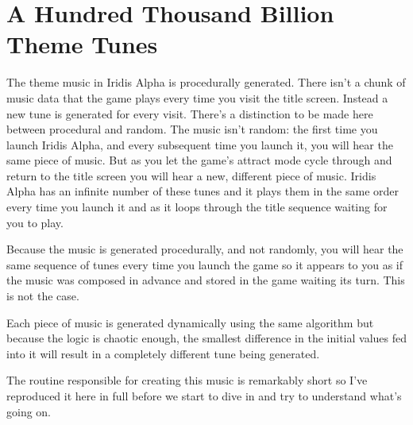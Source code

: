 \chapter{A Hundred Thousand Billion Theme Tunes} 
\label{sec:music}

\lstset{style=6502Style}
The theme music in Iridis Alpha is procedurally generated. There isn't a chunk of music
data that the game plays every time you visit the title screen. Instead a new tune is generated
for every visit. There's a distinction to be made here between procedural and random. The 
music isn't random: the first time you launch Iridis Alpha, and every subsequent time you launch
it, you will hear the same piece of music. But as you let the game's attract mode cycle through and return
to the title screen you will hear a new, different piece of music. Iridis Alpha has an infinite
number of these tunes and it plays them in the same order every time you launch it and as it loops
through the title sequence waiting for you to play.

Because the music is generated procedurally, and not randomly, you will hear the same sequence
of tunes every time you launch the game so it appears to you as if the music was composed in 
advance and stored in the game waiting its turn. This is not the case.

Each piece of music is generated dynamically using the same algorithm but because the logic
is chaotic enough, the smallest difference in the initial values fed into it will result in 
a completely different tune being generated.

The routine responsible for creating this music is remarkably short so I've reproduced it here
in full before we start to dive in and try to understand what's going on.

